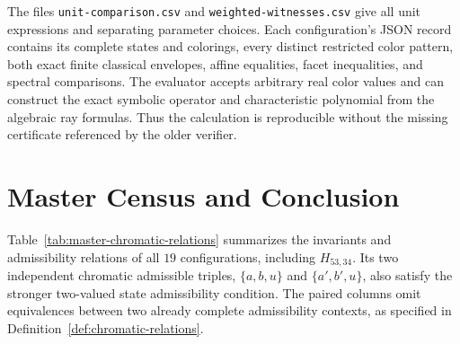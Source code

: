 \documentclass[aps,pra,reprint,superscriptaddress,longbibliography,nofootinbib,floatfix,10pt]{revtex4-2}
\theoremstyle{definition}\newtheorem{definition}[theorem]{Definition}
\theoremstyle{remark}\newtheorem{remark}[theorem]{Remark}
\begin{document}
The files \texttt{unit-comparison.csv} and \texttt{weighted-witnesses.csv} give all unit expressions and separating parameter choices. Each configuration's JSON record contains its complete states and colorings, every distinct restricted color pattern, both exact finite classical envelopes, affine equalities, facet inequalities, and spectral comparisons. The evaluator accepts arbitrary real color values and can construct the exact symbolic operator and characteristic polynomial from the algebraic ray formulas. Thus the calculation is reproducible without the missing certificate referenced by the older verifier.

\section{Master Census and Conclusion}\label{sec:conclusion}

Table~\ref{tab:master-chromatic-relations} summarizes the invariants and admissibility relations of all $19$ configurations, including $H_{53,34}$. Its two independent chromatic admissible triples, $\{a,b,u\}$ and $\{a',b',u\}$, also satisfy the stronger two-valued state admissibility condition. The paired columns omit equivalences between two already complete admissibility contexts, as specified in Definition~\ref{def:chromatic-relations}.
\end{document}

